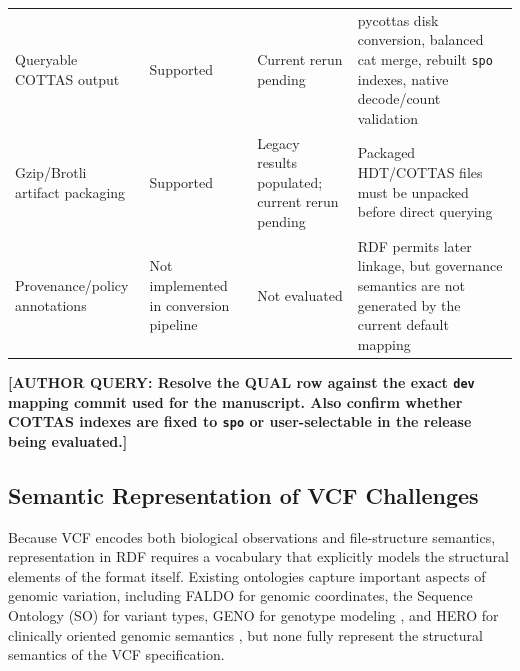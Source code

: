 \documentclass[pdflatex,sn-mathphys-num]{sn-jnl}%
\newenvironment{revision}{\begingroup\color{revisionblue}}{\endgroup}%
\newcommand{\authorquery}[1]{%
  \par\smallskip\noindent
  {\color{queryorange}\textbf{[AUTHOR QUERY: #1]}}%
  \par\smallskip
}%
\theoremstyle{thmstyleone}%
\theoremstyle{thmstyletwo}%
\theoremstyle{thmstylethree}%
\begin{document}
\begin{revision}
\begin{table}[t]
\begin{tabularx}{\textwidth}{@{}p{}p{}p{}X@{}}
Queryable COTTAS output & Supported & Current rerun pending & pycottas disk conversion, balanced cat merge, rebuilt \texttt{spo} indexes, native decode/count validation \\
Gzip/Brotli artifact packaging & Supported & Legacy results populated; current rerun pending & Packaged HDT/COTTAS files must be unpacked before direct querying \\
Provenance/policy annotations & Not implemented in conversion pipeline & Not evaluated & RDF permits later linkage, but governance semantics are not generated by the current default mapping \\
\bottomrule
\end{tabularx}
\end{table}
\end{revision}
\authorquery{Resolve the QUAL row against the exact \texttt{dev} mapping commit used for the manuscript. Also confirm whether COTTAS indexes are fixed to \texttt{spo} or user-selectable in the release being evaluated.}

\subsection{Semantic Representation of VCF Challenges}\label{subsec4.1}
Because VCF encodes both biological observations and file-structure semantics, representation in RDF requires a vocabulary that explicitly models the structural elements of the format itself.
Existing ontologies capture important aspects of genomic variation, including FALDO for genomic coordinates, the Sequence Ontology (SO) \cite{seq_ont_2005} for variant types, GENO for genotype modeling \cite{gene_ont_2000}, and HERO for clinically oriented genomic semantics \cite{hero-genomics_2025}, but none fully represent the structural semantics of the VCF specification. 
\end{document}
